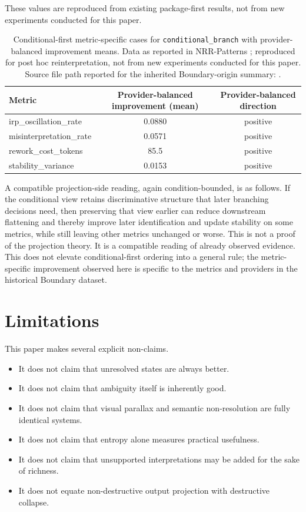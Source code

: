 \documentclass[11pt,a4paper]{article}
\begin{document}
These values are reproduced from existing package-first results, not from new experiments conducted for this paper.

\begin{table}[h]
\centering
\small
\begin{tabular}{p{4.3cm}cc}
\toprule
Metric & Provider-balanced improvement (mean) & Provider-balanced direction \\
\midrule
irp\_oscillation\_rate & 0.0880 & positive \\
misinterpretation\_rate & 0.0571 & positive \\
rework\_cost\_tokens & 85.5 & positive \\
stability\_variance & 0.0153 & positive \\
\bottomrule
\end{tabular}
\caption{Conditional-first metric-specific cases for \texttt{conditional\_branch} with provider-balanced improvement means. Data as reported in NRR-Patterns \cite{saito2026patterns}; reproduced for post hoc reinterpretation, not from new experiments conducted for this paper. Source file path reported for the inherited Boundary-origin summary: \protect{}.}
\label{tab:boundary_conditional_first}
\end{table}

A compatible projection-side reading, again condition-bounded, is as follows. If the conditional view retains discriminative structure that later branching decisions need, then preserving that view earlier can reduce downstream flattening and thereby improve later identification and update stability on some metrics, while still leaving other metrics unchanged or worse. This is not a proof of the projection theory. It is a compatible reading of already observed evidence.
This does not elevate conditional-first ordering into a general rule; the metric-specific improvement observed here is specific to the metrics and providers in the historical Boundary dataset.

\section{Limitations}
\label{sec:limits}

This paper makes several explicit non-claims.

\begin{itemize}
  \item It does not claim that unresolved states are always better.
  \item It does not claim that ambiguity itself is inherently good.
  \item It does not claim that visual parallax and semantic non-resolution are fully identical systems.
  \item It does not claim that entropy alone measures practical usefulness.
  \item It does not claim that unsupported interpretations may be added for the sake of richness.
  \item It does not equate non-destructive output projection with destructive collapse.
\end{itemize}
\end{document}
